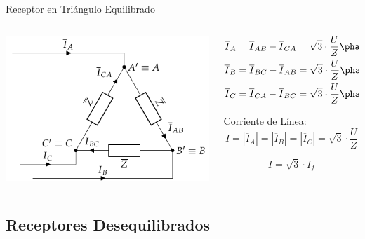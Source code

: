 \documentclass[aspectratio=169, usenames,svgnames,dvipsnames]{beamer}
\begin{document}
\begin{frame}[label={sec:org6ea97b6}]{Receptor en Triángulo Equilibrado}
\begin{columns}
\begin{column}{0.5\columnwidth}
\begin{center}
\includegraphics[width=.9\linewidth]{../figs/TrianguloEquilibrado_Receptor.pdf}
\end{center}
\end{column}

\begin{column}{0.5\columnwidth}
\begin{align*}
  \overline{I}_A &= \overline{I}_{AB} - \overline{I}_{CA} = \sqrt{3} \cdot \frac{U}{Z}\phase{\ang{\pm 90} - \theta}\\
  \overline{I}_B &= \overline{I}_{BC} - \overline{I}_{AB} = \sqrt{3} \cdot \frac{U}{Z}\phase{\ang{\mp 30} - \theta}\\
  \overline{I}_C &= \overline{I}_{CA} - \overline{I}_{BC} = \sqrt{3} \cdot \frac{U}{Z}\phase{\ang{\mp 150} - \theta}\\
\end{align*}

Corriente de Línea:
\[
  \boxed{I = |\overline{I}_A| = |\overline{I}_B| = |\overline{I}_C| = \sqrt{3} \cdot \frac{U}{Z}}
\]

\[
  \boxed{I = \sqrt{3} \cdot I_f}
\]
\end{column}
\end{columns}
\end{frame}


\subsection{Receptores Desequilibrados}
\label{sec:orga263201}
\end{document}
